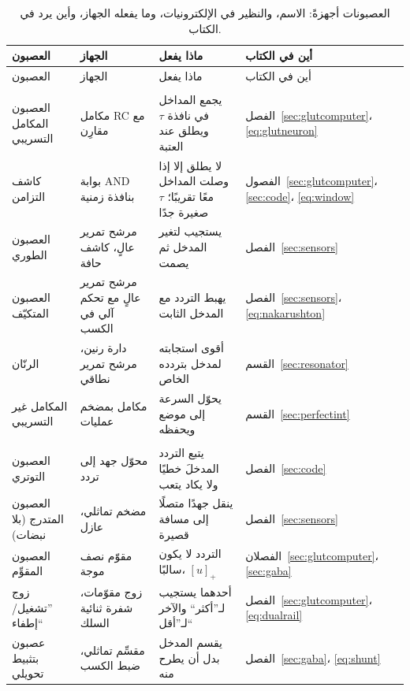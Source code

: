 \begin{center}
\footnotesize
\setlength{\tabcolsep}{3pt}
\renewcommand{\arraystretch}{1.15}
\begin{longtable}{>{\raggedright}p{3.1cm}>{\raggedright}p{3.3cm}>{\raggedright}p{4.7cm}>{\raggedright\arraybackslash}p{2.4cm}}
\caption{العصبونات أجهزةً: الاسم، والنظير في الإلكترونيات، وما يفعله الجهاز، وأين يرد في الكتاب.}\label{tab:eetypes}\\
\toprule
العصبون & الجهاز & ماذا يفعل & أين في الكتاب \\
\midrule
\endfirsthead
\toprule
العصبون & الجهاز & ماذا يفعل & أين في الكتاب \\
\midrule
\endhead
\bottomrule
\endfoot
\multicolumn{4}{l}{\emph{المرشحات والمكاملات}} \\
العصبون المكامل التسريبي & مكامل RC مع مقارِن & يجمع المداخل في نافذة $\tau$ ويطلق عند العتبة & الفصل~\ref{sec:glutcomputer}، \eqref{eq:glutneuron} \\
كاشف التزامن & بوابة AND بنافذة زمنية & لا يطلق إلا إذا وصلت المداخل معًا تقريبًا؛ $\tau$ صغيرة جدًا & الفصول~\ref{sec:glutcomputer}، \ref{sec:code}، \eqref{eq:window} \\
العصبون الطوري & مرشح تمرير عالٍ، كاشف حافة & يستجيب لتغير المدخل ثم يصمت & الفصل~\ref{sec:sensors} \\
العصبون المتكيّف & مرشح تمرير عالٍ مع تحكم آلي في الكسب & يهبط التردد مع المدخل الثابت & الفصل~\ref{sec:sensors}، \eqref{eq:nakarushton} \\
الرنّان & دارة رنين، مرشح تمرير نطاقي & أقوى استجابته لمدخل بتردده الخاص & القسم~\ref{sec:resonator} \\
المكامل غير التسريبي & مكامل بمضخم عمليات & يحوّل السرعة إلى موضع ويحفظه & القسم~\ref{sec:perfectint} \\
\midrule
\multicolumn{4}{l}{\emph{المحوّلات}} \\
العصبون التوتري & محوّل جهد إلى تردد & يتبع التردد المدخلَ خطيًا ولا يكاد يتعب & الفصل~\ref{sec:code} \\
العصبون المتدرج (بلا نبضات) & مضخم تماثلي، عازل & ينقل جهدًا متصلًا إلى مسافة قصيرة & الفصل~\ref{sec:sensors} \\
العصبون المقوِّم & مقوّم نصف موجة & التردد لا يكون سالبًا، $[u]_+$ & الفصلان~\ref{sec:glutcomputer}، \ref{sec:gaba} \\
زوج ”تشغيل/إطفاء“ & زوج مقوّمات، شفرة ثنائية السلك & أحدهما يستجيب لـ”أكثر“ والآخر لـ”أقل“ & الفصل~\ref{sec:glutcomputer}، \eqref{eq:dualrail} \\
عصبون بتثبيط تحويلي & مقسِّم تماثلي، ضبط الكسب & يقسم المدخل بدل أن يطرح منه & الفصل~\ref{sec:gaba}، \eqref{eq:shunt} \\

\end{longtable}
\end{center}
